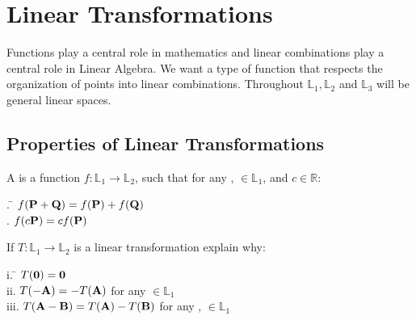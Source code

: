 

\chapter{Linear Transformations}    \label{Linear Transformations}
Functions play a central role in mathematics and linear combinations play a central role in Linear Algebra. We want a type of function that respects the organization of points into linear combinations. Throughout $\mathbb{L}_1, \mathbb{L}_2$ and $\mathbb{L}_3$ will be general linear spaces.

\section{Properties of Linear Transformations}    \label{Properties of Linear Transformations}

\begin{defn} A  is a function $f: \mathbb{L}_1 \longrightarrow \mathbb{L}_2$, such that for any ,  $\in \mathbb{L}_1$, and $c \in \mathbb{R}$: 
	\begin{tabbing}
		. \quad \= $f(\textbf{P}+\textbf{Q}) = f(\textbf{P})+f(\textbf{Q}) $\\
		. \> $f(c\textbf{P}) = cf(\textbf{P})$ 
	\end{tabbing}
\end{defn}


\begin{myexa}[\bd{a}]
	If $T:\mathbb{L}_1 \longrightarrow \mathbb{L}_2$ is a linear transformation explain why:
	\begin{tabbing}
		\indent i. \quad \= $T(\textbf{0}) = \textbf{0}$ \\
		\indent ii. \> $T( -\textbf{A}) = -T(\textbf{A})$ for any  $\in \mathbb{L}_1$\\
		\indent iii. \> $T(\textbf{A}-\textbf{B}) = T(\textbf{A})-T(\textbf{B})$ for any ,  $\in \mathbb{L}_1$\\
	\end{tabbing}
\end{myexa}

